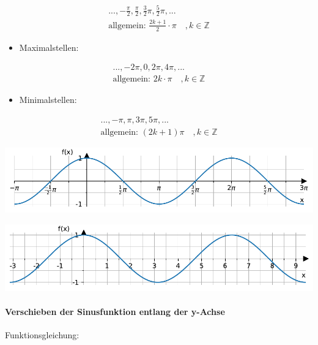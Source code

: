 \documentclass[
  11pt,
  a4paper,
  DIV=11,
  numbers=noendperiod]{scrartcl}
\let\oldparagraph\paragraph
\renewcommand{\paragraph}[1]{\oldparagraph{#1}\mbox{}}
\providecommand{\tightlist}{%
  \setlength{\itemsep}{0pt}\setlength{\parskip}{0pt}}\usepackage{longtable,booktabs,array}
\begin{document}
\[
\begin{aligned}
..., -\frac{\pi}{2}, \frac{\pi}{2}, \frac{3}{2}\pi, \frac{5}{2}\pi, ...\\
\text{allgemein: }\frac{2k+1}{2}\cdot \pi \quad ,k\in \mathbb{Z}
\end{aligned}
\]

\begin{itemize}
\tightlist
\item
  Maximalstellen:
\end{itemize}

\[
\begin{aligned}
..., -2\pi, 0, 2\pi, 4\pi, ...\\
\text{allgemein: }2k\cdot \pi  \quad ,k\in \mathbb{Z}
\end{aligned}
\]

\begin{itemize}
\tightlist
\item
  Minimalstellen:
\end{itemize}

\[
\begin{aligned}
..., -\pi, \pi, 3\pi, 5\pi, ...\\
\text{allgemein: }(2k+1)\pi \quad , k\in \mathbb{Z}
\end{aligned}
\]

\includegraphics{7_Trigonometrische_Funktionen_files/figure-pdf/cell-8-output-1.pdf}

\includegraphics{7_Trigonometrische_Funktionen_files/figure-pdf/cell-9-output-1.pdf}

\paragraph{Verschieben der Sinusfunktion entlang der
y-Achse}\label{verschieben-der-sinusfunktion-entlang-der-y-achse}

Funktionsgleichung:
\end{document}
